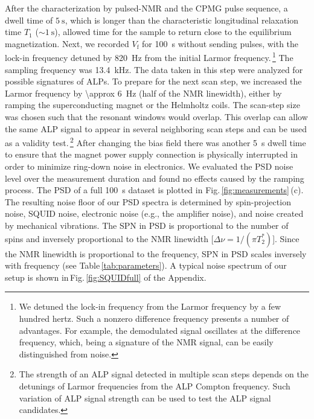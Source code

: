 \documentclass[superscriptaddress,
floatfix,
reprint,
nofootinbib,
amsmath,amssymb,
aps,
prd,
]{revtex4-2}
\begin{document}
After the characterization by pulsed-NMR and the CPMG pulse sequence, a dwell time of $\SI{5}{\s}$, which is longer than the characteristic longitudinal relaxation time $T_1$ ($\sim \SI{1}{\s}$), allowed time for the sample to return close to the equilibrium magnetization. 
Next, we recorded $V_\mathrm{f}$ for \SI{100}{\s} without sending pulses, with the lock-in frequency detuned by \SI{820}{\Hz} from the initial Larmor frequency.\,\footnote{We detuned the lock-in frequency from the Larmor frequency by a few hundred hertz. 
Such a nonzero difference frequency presents a number of advantages.
For example, the demodulated signal oscillates at the difference frequency, which, being a signature of the NMR signal, can be easily distinguished from noise.
}
The sampling frequency was \SI{13.4}{\kHz}. %
The data taken in this step were analyzed for possible signatures of ALPs. To prepare for the next scan step, we increased the Larmor frequency by \SI{\approx 6}{\Hz} (half of the NMR linewidth), either by ramping the superconducting magnet or the Helmholtz coils. 
The scan-step size was chosen such that the resonant windows would overlap. 
This overlap can allow the same ALP signal to appear in several neighboring scan steps and can be used as a validity test.\,\footnote{The strength of an ALP signal detected in multiple scan steps depends on the detunings of Larmor frequencies from the ALP Compton frequency. Such variation of ALP signal strength can be used to test the ALP signal candidates.}
After changing the bias field there was another \SI{5}{\s} dwell time to ensure that the magnet power supply connection is physically interrupted in order to minimize ring-down noise in electronics.
We evaluated the PSD noise level over the measurement duration and found no effects caused by the ramping process.
The PSD of a full \SI{100}{\s} dataset is plotted in Fig.\,\ref{fig:measurements}\,(c).
The resulting noise floor of our PSD spectra is determined by spin-projection noise, SQUID noise, electronic noise (e.g., the amplifier noise), and noise created by mechanical vibrations. 
The SPN in PSD is proportional to the number of spins and inversely proportional to the NMR linewidth [$\Delta\nu=1/(\pi T_2^*)$].
Since the NMR linewidth is proportional to the frequency, SPN in PSD scales inversely with frequency (see Table\,\ref{tab:parameters}). A typical noise spectrum of our setup is shown in\,Fig.\,\ref{fig:SQUIDfull} of the Appendix. 
\end{document}
